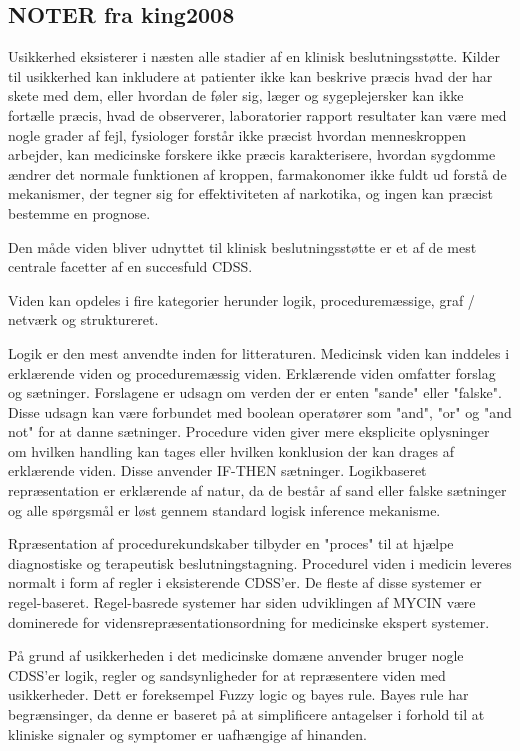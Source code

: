 \subsection{NOTER fra king2008}
Usikkerhed eksisterer i næsten alle stadier af en klinisk beslutningsstøtte. Kilder til usikkerhed kan inkludere at patienter ikke kan beskrive præcis hvad der har skete med dem, eller hvordan de føler sig, læger og sygeplejersker kan ikke fortælle præcis, hvad de observerer, laboratorier
rapport resultater kan være med nogle grader af fejl, fysiologer forstår ikke præcist hvordan menneskroppen arbejder, kan medicinske forskere ikke præcis karakterisere, hvordan sygdomme ændrer det normale funktionen af kroppen, farmakonomer ikke fuldt ud forstå de mekanismer, der tegner sig for effektiviteten af narkotika, og ingen kan præcist bestemme en prognose.\citep{KONG2008}

Den måde viden bliver udnyttet til klinisk
beslutningsstøtte er et af de mest centrale facetter af en succesfuld CDSS. \citep{KONG2008}

Viden kan opdeles i fire kategorier herunder 
logik, proceduremæssige, graf / netværk og struktureret. \citep{KONG2008}

Logik er den mest anvendte inden for litteraturen. Medicinsk viden kan inddeles i erklærende viden og proceduremæssig viden. Erklærende viden  omfatter forslag og sætninger. Forslagene er udsagn om verden der er enten "sande" eller "falske". Disse udsagn kan være forbundet med boolean operatører som "and", "or"
og "and not" for at danne sætninger. Procedure viden giver mere eksplicite oplysninger om hvilken handling kan tages eller hvilken konklusion der kan drages af
erklærende viden. Disse anvender IF-THEN sætninger. Logikbaseret repræsentation er erklærende af natur, da de består af sand eller falske sætninger og alle spørgsmål er løst gennem standard logisk inference mekanisme. \citep{KONG2008}

Rpræsentation af procedurekundskaber tilbyder en "proces" til at hjælpe diagnostiske og terapeutisk beslutningstagning. Procedurel viden i
medicin leveres normalt i form af regler i
eksisterende CDSS'er. De fleste af disse systemer er regel-baseret. Regel-basrede systemer har siden udviklingen af MYCIN være dominerede for vidensrepræsentationsordning for medicinske ekspert systemer. \citep{KONG2008}

På grund af usikkerheden i det medicinske domæne anvender bruger nogle CDSS'er logik, regler og sandsynligheder for at repræsentere viden med usikkerheder. Dett er foreksempel Fuzzy logic og bayes rule. Bayes rule har begrænsinger, da denne er baseret på at simplificere antagelser i forhold til at kliniske signaler og symptomer er uafhængige af hinanden. \citep{KONG2008}

